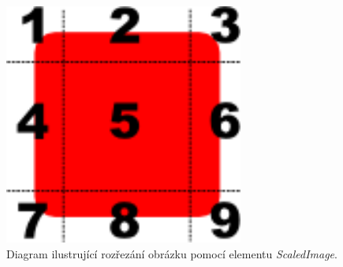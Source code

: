 \documentclass[11pt,twoside,a4paper]{book}
\begin{document}
\begin{figure}[!ht]
\begin{center}
  \includegraphics[width=0.7\textwidth]{imgCut}
\caption{{\label{fig:cut}}Diagram ilustrující rozřezání obrázku pomocí elementu \textit{ScaledImage}.}
\end{center}
\end{figure}

\end{document}
